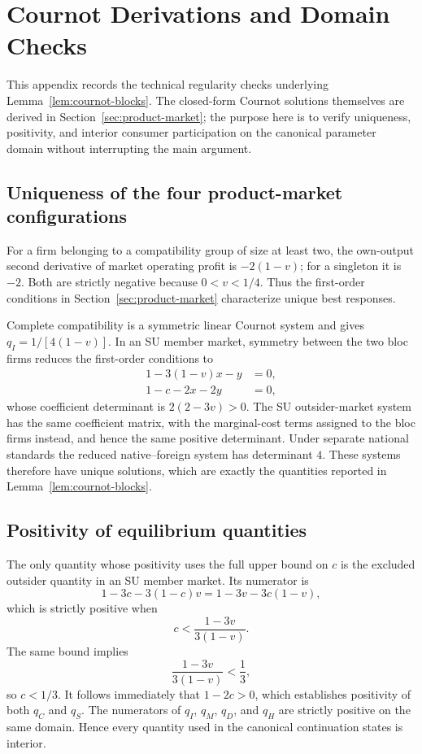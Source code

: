 \section{Cournot Derivations and Domain Checks}
\label{app:cournot}

This appendix records the technical regularity checks underlying Lemma~\ref{lem:cournot-blocks}. The closed-form Cournot solutions themselves are derived in Section~\ref{sec:product-market}; the purpose here is to verify uniqueness, positivity, and interior consumer participation on the canonical parameter domain without interrupting the main argument.

\subsection{Uniqueness of the four product-market configurations}

For a firm belonging to a compatibility group of size at least two, the own-output second derivative of market operating profit is $-2(1-v)$; for a singleton it is $-2$. Both are strictly negative because $0<v<1/4$. Thus the first-order conditions in Section~\ref{sec:product-market} characterize unique best responses.

Complete compatibility is a symmetric linear Cournot system and gives $q_I=1/[4(1-v)]$. In an SU member market, symmetry between the two bloc firms reduces the first-order conditions to
\begin{align}
1-3(1-v)x-y&=0,\\
1-c-2x-2y&=0,
\end{align}
whose coefficient determinant is $2(2-3v)>0$. The SU outsider-market system has the same coefficient matrix, with the marginal-cost terms assigned to the bloc firms instead, and hence the same positive determinant. Under separate national standards the reduced native--foreign system has determinant $4$. These systems therefore have unique solutions, which are exactly the quantities reported in Lemma~\ref{lem:cournot-blocks}.

\subsection{Positivity of equilibrium quantities}

The only quantity whose positivity uses the full upper bound on $c$ is the excluded outsider quantity in an SU member market. Its numerator is
\[
1-3c-3(1-c)v
=1-3v-3c(1-v),
\]
which is strictly positive when
\[
c<\frac{1-3v}{3(1-v)}.
\]
The same bound implies
\[
\frac{1-3v}{3(1-v)}<\frac13,
\]
so $c<1/3$. It follows immediately that $1-2c>0$, which establishes positivity of both $q_C$ and $q_S$. The numerators of $q_I$, $q_M$, $q_D$, and $q_H$ are strictly positive on the same domain. Hence every quantity used in the canonical continuation states is interior.


